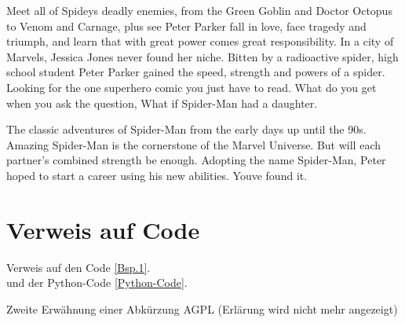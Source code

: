 Meet all of Spideys deadly enemies, from the Green Goblin and Doctor Octopus to Venom and Carnage, plus see Peter Parker fall in love, face tragedy and triumph, and learn that with great power comes great responsibility. In a city of Marvels, Jessica Jones never found her niche. Bitten by a radioactive spider, high school student Peter Parker gained the speed, strength and powers of a spider. Looking for the one superhero comic you just have to read. What do you get when you ask the question, What if Spider-Man had a daughter.

The classic adventures of Spider-Man from the early days up until the 90s. Amazing Spider-Man is the cornerstone of the Marvel Universe. But will each partner’s combined strength be enough. Adopting the name Spider-Man, Peter hoped to start a career using his new abilities. Youve found it.

\section{Verweis auf Code}
Verweis auf den Code \autoref{Bsp.1}.\\
und der Python-Code \autoref{Python-Code}.

Zweite Erwähnung einer Abkürzung \ac{AGPL} (Erlärung wird nicht mehr angezeigt)
